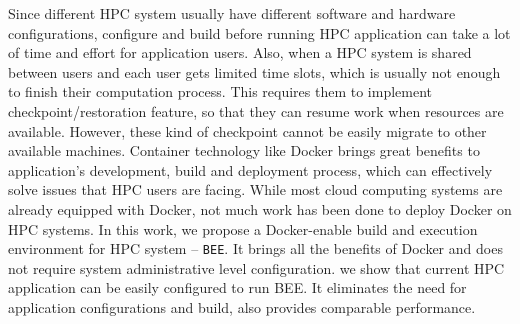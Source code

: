 Since different HPC system usually have different software and hardware configurations, configure and build before running HPC application can take a lot of time and effort for application users. Also, when a HPC system is shared between users and each user gets limited time slots, which is usually not enough to finish their computation process. This requires them to implement checkpoint/restoration feature, so that they can resume work when resources are available. However, these kind of checkpoint cannot be easily migrate to other available machines. Container technology like Docker brings great benefits to application's development, build and deployment process, which can effectively solve issues that HPC users are facing. While most cloud computing systems are already equipped with Docker, not much work has been done to deploy Docker on HPC systems. In this work, we propose a Docker-enable build and execution environment for HPC system -- \texttt{BEE}. It brings all the benefits of Docker and does not require system administrative level configuration. we show that current HPC application can be easily configured to run BEE. It eliminates the need for application configurations and build, also provides comparable performance. 